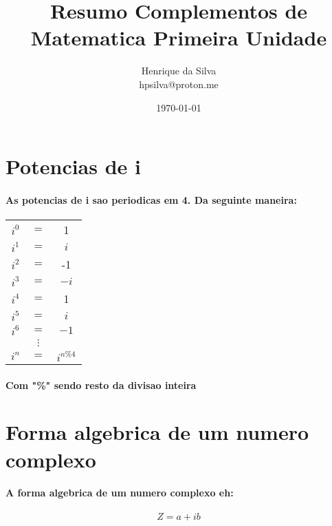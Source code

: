 \documentclass[12pt,twoside, a4paper, twocolumn]{article}
\title{Resumo Complementos de Matematica Primeira Unidade}
\author{Henrique da Silva \\ hpsilva@proton.me}
\date{\today}
\begin{document}
\maketitle
{}
\newpage
\tableofcontents
\newpage

\newcommand\deriv[2]{\frac{\mathrm d #1}{\mathrm d #2}}

\section{Potencias de i}
\paragraph{As potencias de i sao periodicas em 4. Da seguinte maneira:
}
\begin{center}
    \begin{tabular}{ |ccc| }
        \hline
        $i^0$ & $=$      & 1            \\
        $i^1$ & $=$      & $i$          \\
        $i^2$ & $=$      & -1           \\
        $i^3$ & $=$      & $-i$         \\
        $i^4$ & $=$      & 1            \\
        $i^5$ & $=$      & $i$          \\
        $i^6$ & $=$      & $-1$         \\
              & $\vdots$ &              \\
        $i^n$ & $=$      & $i^{n \% 4}$ \\
        \hline
    \end{tabular}
\end{center}
\paragraph{Com "\%" sendo resto da divisao inteira
}

\section{Forma algebrica de um numero complexo}
\paragraph{A forma algebrica de um numero complexo eh:}
\begin{equation}
    Z = a + ib
\end{equation}
\end{document}
